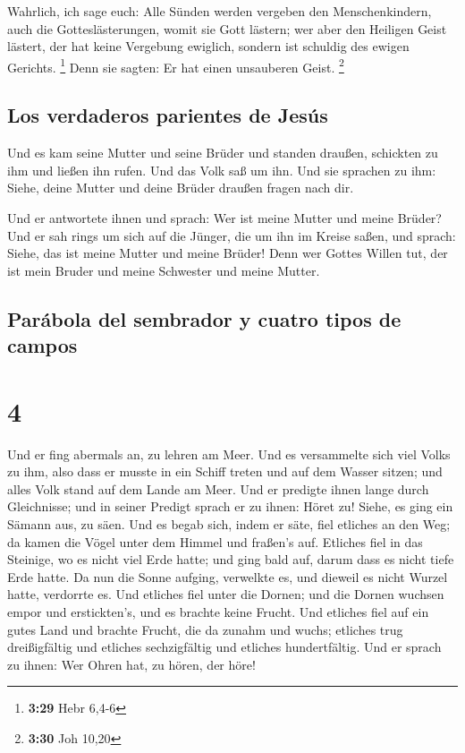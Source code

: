  Wahrlich, ich sage euch: Alle Sünden werden vergeben den
Menschenkindern, auch die Gotteslästerungen, womit sie Gott lästern;
 wer aber den Heiligen Geist lästert, der hat keine
Vergebung ewiglich, sondern ist schuldig des ewigen Gerichts.
\footnote{\textbf{3:29} Hebr 6,4-6}  Denn sie sagten: Er
hat einen unsauberen Geist. \footnote{\textbf{3:30} Joh 10,20}

\hypertarget{los-verdaderos-parientes-de-jesuxfas}{%
\subsection{Los verdaderos parientes de
Jesús}\label{los-verdaderos-parientes-de-jesuxfas}}

 Und es kam seine Mutter und seine Brüder und standen
draußen, schickten zu ihm und ließen ihn rufen.  Und das
Volk saß um ihn. Und sie sprachen zu ihm: Siehe, deine Mutter und deine
Brüder draußen fragen nach dir.

 Und er antwortete ihnen und sprach: Wer ist meine Mutter
und meine Brüder?  Und er sah rings um sich auf die
Jünger, die um ihn im Kreise saßen, und sprach: Siehe, das ist meine
Mutter und meine Brüder!  Denn wer Gottes Willen tut, der
ist mein Bruder und meine Schwester und meine Mutter.

\hypertarget{paruxe1bola-del-sembrador-y-cuatro-tipos-de-campos}{%
\subsection{Parábola del sembrador y cuatro tipos de
campos}\label{paruxe1bola-del-sembrador-y-cuatro-tipos-de-campos}}

\hypertarget{section-3}{%
\section{4}\label{section-3}}

 Und er fing abermals an, zu lehren am Meer. Und es
versammelte sich viel Volks zu ihm, also dass er musste in ein Schiff
treten und auf dem Wasser sitzen; und alles Volk stand auf dem Lande am
Meer.  Und er predigte ihnen lange durch Gleichnisse; und
in seiner Predigt sprach er zu ihnen:  Höret zu! Siehe, es
ging ein Sämann aus, zu säen.  Und es begab sich, indem er
säte, fiel etliches an den Weg; da kamen die Vögel unter dem Himmel und
fraßen's auf.  Etliches fiel in das Steinige, wo es nicht
viel Erde hatte; und ging bald auf, darum dass es nicht tiefe Erde
hatte.  Da nun die Sonne aufging, verwelkte es, und
dieweil es nicht Wurzel hatte, verdorrte es.  Und etliches
fiel unter die Dornen; und die Dornen wuchsen empor und erstickten's,
und es brachte keine Frucht.  Und etliches fiel auf ein
gutes Land und brachte Frucht, die da zunahm und wuchs; etliches trug
dreißigfältig und etliches sechzigfältig und etliches hundertfältig.
 Und er sprach zu ihnen: Wer Ohren hat, zu hören, der
höre!

